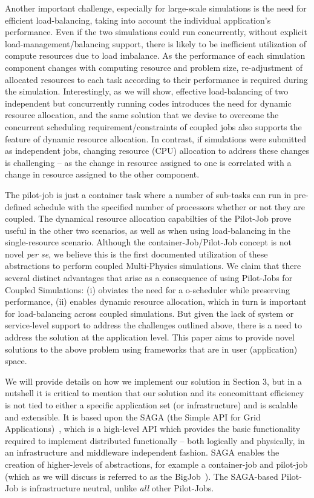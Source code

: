 \documentclass[conference,final]{IEEEtran}
\begin{document}
Another important challenge, especially for large-scale simulations is
the need for efficient load-balancing, taking into account the
individual application's performance. Even if the two simulations could
run concurrently, without explicit load-management/balancing support,
there is likely to be inefficient utilization of compute resources due
to load imbalance. As the performance of each simulation component
changes with computing resource and problem size, re-adjustment of
allocated resources to each task according to their performance is
required during the simulation. Interestingly, as we will show,
effective load-balancing of two independent but concurrently running
codes introduces the need for dynamic resource allocation, and the
same solution that we devise to overcome the concurrent scheduling
requirement/constraints of coupled jobs also supports the feature of
dynamic resource allocation. In contrast, if simulations were
submitted as independent jobs, changing resource (CPU) allocation to
address these changes is challenging -- as the change in resource
assigned to one is correlated with a change in resource assigned to
the other component.

The pilot-job is just a container task where a number of sub-tasks can
run in pre-defined schedule with the specified number of processors
whether or not they are coupled.  The dynamical resource allocation
capabilties of the Pilot-Job prove useful in the other two scenarios,
as well as when using load-balancing in the single-resource scenario.
Although the container-Job/Pilot-Job concept is not novel {\it per
  se}, we believe this is the first documented utilization of these
abstractions to perform coupled Multi-Physics simulations. We claim
that there several distinct advantages that arise as a consequence of
using Pilot-Jobs for Coupled Simulations: (i) obviates the need for a
o-scheduler while preserving performance, (ii) enables dynamic
resource allocation, which in turn is important for load-balancing
across coupled simulations.  But given the lack of system or
service-level support to address the challenges outlined above, there
is a need to address the solution at the application level. This paper
aims to provide novel solutions to the above problem using frameworks
that are in user (application) space.
 
We will provide details on how we implement our solution in Section 3,
but in a nutshell it is critical to mention that our solution and its
concomittant efficiency is not tied to either a specific application
set (or infrastructure) and is scalable and extensible. It is based
upon the SAGA (the Simple API for Grid Applications)~\cite{saga_web},
which is a high-level API which provides the basic functionality
required to implement distributed functionally -- both logically and
physically, in an infrastructure and middleware independent
fashion. SAGA enables the creation of higher-levels of abstractions,
for example a container-job and pilot-job (which as we will discuss is
referred to as the BigJob~\cite{saga_royalsoc}). The SAGA-based
Pilot-Job is infrastructure neutral, unlike {\it all} other
Pilot-Jobs.
\end{document}
